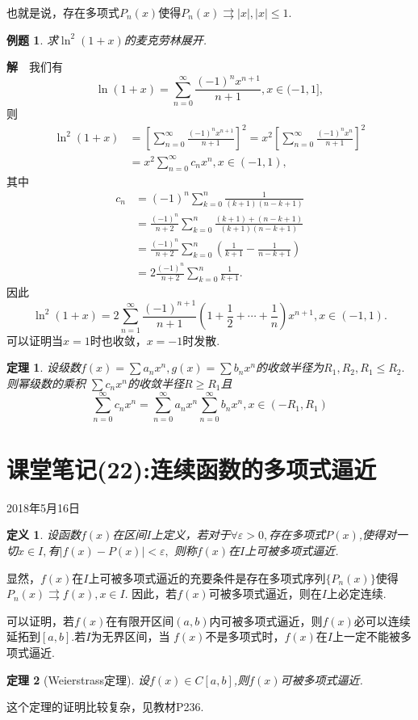 \documentclass[UTF8]{article}
\newcommand{\jie}{\textbf{解}$\quad$}
\newtheorem{thm}{\hspace{2em}定理}[section]
\newtheorem{dfn}{\hspace{2em}定义}[section]
\newtheorem{exa}{\hspace{2em}例题}[section]
\begin{document}
  也就是说，存在多项式$P_n(x)$使得$P_n(x)\rightrightarrows |x|,|x|\le 1.$
  \begin{exa}
    求$\ln^2(1+x)$的麦克劳林展开.
  \end{exa}
  \jie 我们有
  $$\ln(1+x)=\sum_{n=0}^\infty\dfrac{(-1)^nx^{n+1}}{n+1},x\in(-1,1],$$
  则
  \begin{align*}
    \ln^2(1+x)&=\left[\sum_{n=0}^\infty\frac{(-1)^nx^{n+1}}{n+1}\right]^2
    =x^2\left[\sum_{n=0}^\infty\frac{(-1)^nx^n}{n+1}\right]^2\\
    &=x^2\sum_{n=0}^\infty c_nx^n,x\in(-1,1),
  \end{align*}
  其中
  \begin{align*}
    c_n&=(-1)^n\sum_{k=0}^n\frac{1}{(k+1)(n-k+1)}\\
    &=\frac{(-1)^n}{n+2}\sum_{k=0}^n\frac{(k+1)+(n-k+1)}{(k+1)(n-k+1)}\\
    &=\frac{(-1)^n}{n+2}\sum_{k=0}^n\left(\frac{1}{k+1}-\frac{1}{n-k+1}\right)\\
    &=2\frac{(-1)^n}{n+2}\sum_{k=0}^n\frac{1}{k+1}.
  \end{align*}
  因此
  $$\ln^2(1+x)=2\sum_{n=1}^\infty\frac{(-1)^{n+1}}{n+1}\left(1+\frac{1}{2}+\cdots+\frac{1}{n}\right)x^{n+1},x\in(-1,1).$$
  可以证明当$x=1$时也收敛，$x=-1$时发散.
  \begin{thm}
    设级数$f(x)=\sum a_nx^n,g(x)=\sum b_nx^n$的收敛半径为$R_1,R_2,R_1\le R_2.$则幂级数的乘积
    $\sum c_nx^n$的收敛半径$R\ge R_1$且
    $$\sum_{n=0}^\infty c_nx^n=\sum_{n=0}^\infty a_nx^n \sum_{n=0}^\infty b_nx^n,x\in(-R_1,R_1)$$
  \end{thm}

  \clearpage
  \section{课堂笔记(22):连续函数的多项式逼近}
  \begin{center}
    2018年5月16日
  \end{center}
  \begin{dfn}
    设函数$f(x)$在区间$I$上定义，若对于$\forall\varepsilon>0,$存在多项式$P(x)$,使得对一切$x\in I,$有$|f(x)-P(x)|<\varepsilon,$
    则称$f(x)$在$I$上可被多项式逼近.
  \end{dfn}
  显然，$f(x)$在$I$上可被多项式逼近的充要条件是存在多项式序列$\{P_n(x)\}$使得$P_n(x)\rightrightarrows f(x),x\in I.$
  因此，若$f(x)$可被多项式逼近，则在$I$上必定连续.

  可以证明，若$f(x)$在有限开区间$(a,b)$内可被多项式逼近，则$f(x)$必可以连续延拓到$[a,b]$.若$I$为无界区间，当
  $f(x)$不是多项式时，$f(x)$在$I$上一定不能被多项式逼近.
  \begin{thm}[Weierstrass定理]
    设$f(x)\in C[a,b]$,则$f(x)$可被多项式逼近.
  \end{thm}
  这个定理的证明比较复杂，见教材P236.
\end{document}
